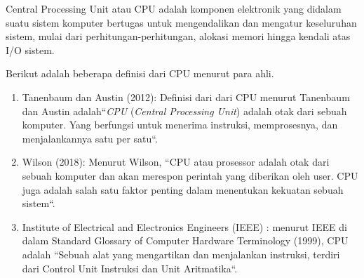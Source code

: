 Central Processing Unit atau CPU adalah komponen elektronik yang didalam suatu sistem komputer bertugas
untuk mengendalikan dan mengatur keseluruhan sistem, mulai dari perhitungan-perhitungan,
alokasi memori hingga kendali atas I/O sistem.

\begin{flushleft}
Berikut adalah beberapa definisi dari CPU menurut para ahli.
\end{flushleft}

\begin{enumerate}[label=\alph*.]
  \item Tanenbaum dan Austin (2012): Definisi dari dari CPU menurut Tanenbaum dan Austin adalah``\textit{CPU} (\textit{Central Processing Unit}) adalah otak dari sebuah komputer. Yang berfungsi untuk menerima instruksi, memprosesnya, dan menjalankannya satu per satu``.
  \item Wilson (2018): Menurut Wilson, ``CPU atau prosessor adalah otak dari sebuah komputer dan akan merespon perintah yang diberikan oleh user. CPU juga adalah salah satu faktor penting dalam menentukan kekuatan sebuah sistem``.
  \item Institute of Electrical and Electronics Engineers (IEEE) : menurut IEEE di dalam Standard Glossary of Computer Hardware Terminology (1999), CPU adalah ``Sebuah alat yang mengartikan dan menjalankan instruksi, terdiri dari Control Unit Instruksi dan Unit Aritmatika``.
\end{enumerate}
